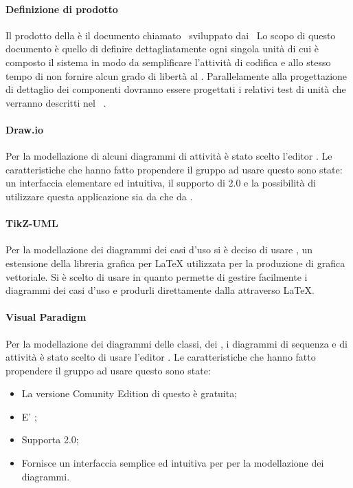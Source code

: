 \documentclass[12pt,a4paper]{article}
\begin{document}
\paragraph{Definizione di prodotto}
\TODO{}
Il prodotto della  è il documento chiamato \DP\ sviluppato dai \PGpl\
Lo scopo di questo documento è quello di definire dettagliatamente ogni singola unità
di cui è composto il sistema in modo da semplificare l’attività di codifica e allo stesso
tempo di non fornire alcun grado di libertà al \PR{}.
Parallelamente alla progettazione di dettaglio dei componenti  dovranno essere
progettati i relativi test di unità che verranno descritti nel \PdQ\ .


\paragraph{Draw.io}		 
Per la modellazione di alcuni diagrammi di attività è stato scelto l’editor . Le caratteristiche che hanno fatto propendere il gruppo ad usare questo  sono state: un interfaccia elementare ed intuitiva, il supporto di 2.0 e la possibilità di utilizzare questa applicazione sia da  che da .

\paragraph{TikZ-UML}\label{tikZ-UML}
Per la modellazione dei diagrammi dei casi d'uso si è deciso di usare , un estensione della libreria grafica   per \LaTeX{} utilizzata per la produzione di grafica vettoriale.
Si è scelto di usare \mgls{tikz-uml} in quanto permette di gestire facilmente i diagrammi dei casi d'uso e produrli direttamente dalla attraverso \LaTeX{}.


\paragraph{Visual Paradigm}\label{visualParadigm}
Per la modellazione dei diagrammi delle classi, dei  , i diagrammi di sequenza e di attività è stato scelto di usare l'editor . Le caratteristiche che hanno fatto propendere il gruppo ad usare questo  sono state:
\begin{itemize}
	\item La versione Comunity Edition di questo  è gratuita;
	\item E' \mgls{cross-platform};
	\item Supporta 2.0;
	\item Fornisce un interfaccia semplice ed intuitiva per per la modellazione dei diagrammi.
\end{itemize}
\end{document}
